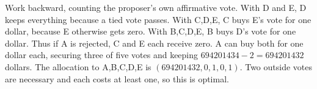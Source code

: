 Work backward, counting the proposer's own affirmative vote. With D and E, D keeps everything because a tied vote passes. With C,D,E, C buys E's vote for one dollar, because E otherwise gets zero. With B,C,D,E, B buys D's vote for one dollar. Thus if A is rejected, C and E each receive zero. A can buy both for one dollar each, securing three of five votes and keeping $694201434-2=\boxed{694201432}$ dollars. The allocation to A,B,C,D,E is $(694201432,0,1,0,1)$. Two outside votes are necessary and each costs at least one, so this is optimal.

